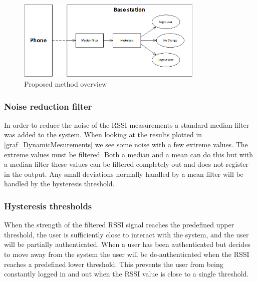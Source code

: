 \begin{figure}[!t]
	\centering
	\includegraphics[width=3.5in]{img/SolutionOverview}
	\caption{ Proposed method overview }
	\label{fig_solution_overview}
\end{figure}



\subsubsection{Noise reduction filter}
In order to reduce the noise of the RSSI measurements a standard median-filter was added to the system.
When looking at the results plotted in \cref{graf_DynamicMesurements} we see some noise with a few extreme values.
The extreme values must be filtered. Both a median and a mean can do this but with a median filter these values can be filtered completely out and does not register in the output. Any small deviations normally handled by a mean filter will be handled by the hysteresis threshold.

\subsubsection{Hysteresis thresholds}
When the strength of the filtered RSSI signal reaches the predefined upper threshold, the user is sufficiently close to interact with the system, and the user will be partially authenticated.
When a user has been authenticated but decides to move away from the system the user will be de-authenticated when the RSSI reaches a predefined lower threshold.
This prevents the user from being constantly logged in and out when the RSSI value is close to a single threshold.
